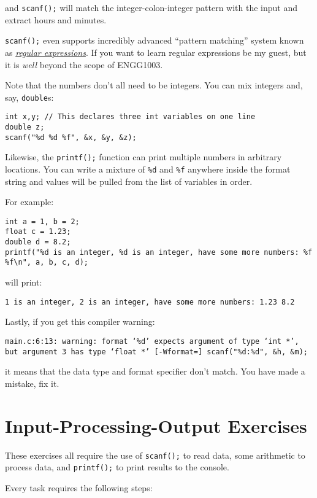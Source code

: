 \documentclass{lab}
\begin{document}
and \texttt{scanf();} will match the integer-colon-integer pattern with the input and extract hours and minutes.

\texttt{scanf();} even supports incredibly advanced ``pattern matching'' system known as \textit{\href{https://xkcd.com/208/}{regular expressions}}. If you want to learn regular expressions be my guest, but it is \textit{well} beyond the scope of ENGG1003.

Note that the numbers don't all need to be integers. You can mix integers and, say, \texttt{double}s:

\begin{lstlisting}[style=CStyle]
int x,y; // This declares three int variables on one line
double z;
scanf("%d %d %f", &x, &y, &z);
\end{lstlisting}

Likewise, the \texttt{printf();} function can print multiple numbers in arbitrary locations. You can write a mixture of \texttt{\%d} and \texttt{\%f} anywhere inside the format string and values will be pulled from the list of variables in order.

For example:

\begin{lstlisting}[style=CStyle]
int a = 1, b = 2;
float c = 1.23;
double d = 8.2;
printf("%d is an integer, %d is an integer, have some more numbers: %f %f\n", a, b, c, d);
\end{lstlisting}

will print:

\texttt{1 is an integer, 2 is an integer, have some more numbers: 1.23 8.2}

Lastly, if you get this compiler warning:


\texttt{main.c:6:13: warning: format ‘\%d’ expects argument of type ‘int *’, but argument 3 has type ‘float *’ [-Wformat=]
  scanf("\%d:\%d", \&h, \&m);}


it means that the data type and format specifier don't match. You have made a mistake, fix it.


\pagebreak
\section{Input-Processing-Output Exercises}

These exercises all require the use of \texttt{scanf();} to read data, some arithmetic to process data, and \texttt{printf();} to print results to the console.

Every task requires the following steps:
\end{document}
